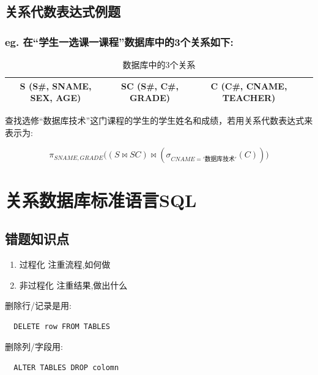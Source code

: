 \documentclass[a4paper,12pt,UTF8,fontset=none]{ctexart}
\newcounter{mycounter}
\let\oldsection\section
\renewcommand{\section}{%
  \setcounter{mycounter}{0}%
  \oldsection%
}
\begin{document}
\subsection{关系代数表达式例题}
\subsubsection*{eg. 在“学生一选课一课程”数据库中的3个关系如下:}

\begin{table}[H]
\centering
\caption{数据库中的3个关系}
\begin{tabular}{c c c c}
\toprule
S (S\#, SNAME, SEX, AGE) & SC (S\#, C\#, GRADE) & C (C\#, CNAME, TEACHER) \\
\midrule
\end{tabular}

\end{table}

查找选修“数据库技术”这门课程的学生的学生姓名和成绩，若用关系代数表达式来表示为:

\begin{equation*}%
\pi_{SNAME,GRADE} \big((S \bowtie SC )\bowtie (\sigma_{CNAME='\text{数据库技术}'} (C))\big) 
\end{equation*}
\newpage
\section{关系数据库标准语言SQL}
\subsection{错题知识点}
\begin{enumerate}
  \item 过程化
  注重流程,如何做
  \item 非过程化
  注重结果,做出什么
\end{enumerate}
删除行/记录是用:
\begin{lstlisting}
  DELETE row FROM TABLES
\end{lstlisting}
删除列/字段用:
\begin{lstlisting}
  ALTER TABLES DROP colomn
\end{lstlisting}
\end{document}
